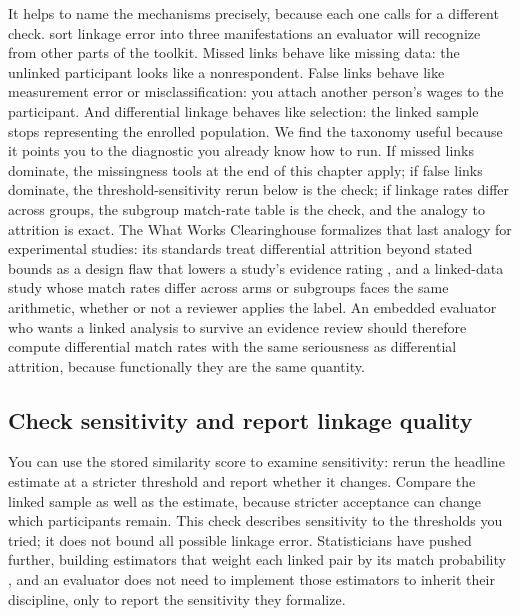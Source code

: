 \documentclass[
    a4paper,
    fontsize=10pt,
    twoside=true,
    numbers=noenddot,
]{kaobook}
\begin{document}
It helps to name the mechanisms precisely, because each one calls for a different check. \textcite{doidge2019linkage} sort linkage error into three manifestations an evaluator will recognize from other parts of the toolkit. Missed links behave like missing data: the unlinked participant looks like a nonrespondent. False links behave like measurement error or misclassification: you attach another person's wages to the participant. And differential linkage behaves like selection: the linked sample stops representing the enrolled population. We find the taxonomy useful because it points you to the diagnostic you already know how to run. If missed links dominate, the missingness tools at the end of this chapter apply; if false links dominate, the threshold-sensitivity rerun below is the check; if linkage rates differ across groups, the subgroup match-rate table is the check, and the analogy to attrition is exact. The What Works Clearinghouse formalizes that last analogy for experimental studies: its standards treat differential attrition beyond stated bounds as a design flaw that lowers a study's evidence rating \parencite{wwc2022handbook}, and a linked-data study whose match rates differ across arms or subgroups faces the same arithmetic, whether or not a reviewer applies the label. An embedded evaluator who wants a linked analysis to survive an evidence review should therefore compute differential match rates with the same seriousness as differential attrition, because functionally they are the same quantity.

\subsection{Check sensitivity and report linkage quality}\label{sec:ch06-defenses}
You can use the stored similarity score to examine sensitivity: rerun the headline estimate at a stricter threshold and report whether it changes. Compare the linked sample as well as the estimate, because stricter acceptance can change which participants remain. This check describes sensitivity to the thresholds you tried; it does not bound all possible linkage error. Statisticians have pushed further, building estimators that weight each linked pair by its match probability \parencite{lahiri2005linked}, and an evaluator does not need to implement those estimators to inherit their discipline, only to report the sensitivity they formalize.
\end{document}
